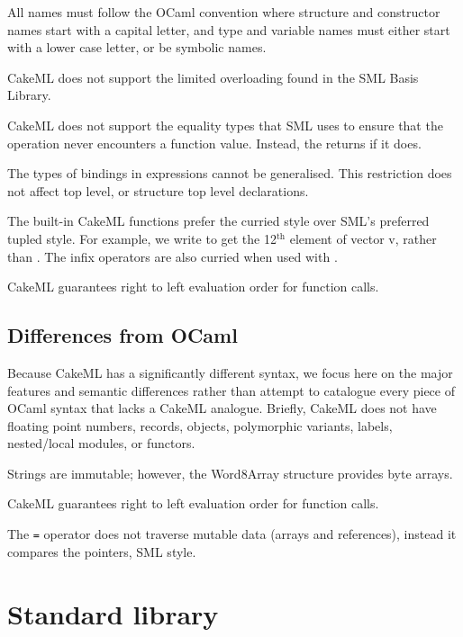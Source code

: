 \documentclass[12pt,a4paper]{book}
\begin{document}
All names must follow the OCaml convention where structure and constructor names start with a capital letter, and type and variable names must either start with a lower case letter, or be symbolic names.

CakeML does not support the limited overloading found in the SML Basis Library.

CakeML does not support the equality types that SML uses to ensure that the \smlinline{=} operation never encounters a function value. Instead, the \smlinline{=} returns  if it does.

The types of bindings in  expressions cannot be generalised. This restriction does not affect top level, or structure top level declarations.

The built-in CakeML functions prefer the curried style over SML's preferred tupled style. For example, we write  to get the 12$^\textrm{th}$ element of vector v, rather than . The infix operators are also curried when used with .

CakeML guarantees right to left evaluation order for function calls.

\section{Differences from OCaml}

Because CakeML has a significantly different syntax, we focus here on the major features and semantic differences rather than attempt to catalogue every piece of OCaml syntax that lacks a CakeML analogue. Briefly, CakeML does not have floating point numbers, records, objects, polymorphic variants, labels, nested/local modules, or functors.

Strings are immutable; however, the Word8Array structure provides byte arrays.

CakeML guarantees right to left evaluation order for function calls.

The \texttt{=} operator does not traverse mutable data (arrays and references), instead it compares the pointers, SML style.

\chapter{Standard library}
\label{ch:stdlib}

\end{document}
